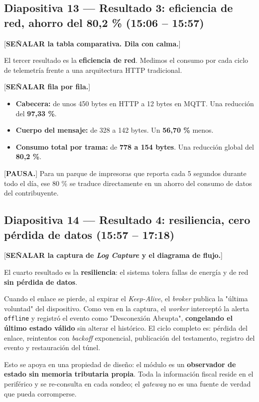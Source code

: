 \documentclass[11pt, a4paper]{article}
\begin{document}
\subsection*{Diapositiva 13 — Resultado 3: eficiencia de red, ahorro del 80,2 \% (15:06 – 15:57)}

[\textbf{SEÑALAR la tabla comparativa. Dila con calma.}]

El tercer resultado es la \textbf{eficiencia de red}. Medimos el consumo por cada ciclo de telemetría frente a una arquitectura HTTP tradicional.

[\textbf{SEÑALAR fila por fila.}]

\begin{itemize}[label=-]
    \item \textbf{Cabecera:} de unos 450 bytes en HTTP a 12 bytes en MQTT. Una reducción del \textbf{97,33 \%}.
    \item \textbf{Cuerpo del mensaje:} de 328 a 142 bytes. Un \textbf{56,70 \%} menos.
    \item \textbf{Consumo total por trama:} de \textbf{778 a 154 bytes}. Una reducción global del \textbf{80,2 \%}.
\end{itemize}

[\textbf{PAUSA.}] Para un parque de impresoras que reporta cada 5 segundos durante todo el día, ese 80 \% se traduce directamente en un ahorro del consumo de datos del contribuyente.

\subsection*{Diapositiva 14 — Resultado 4: resiliencia, cero pérdida de datos (15:57 – 17:18)}

[\textbf{SEÑALAR la captura de \textit{Log Capture} y el diagrama de flujo.}]

El cuarto resultado es la \textbf{resiliencia}: el sistema tolera fallas de energía y de red \textbf{sin pérdida de datos}.

Cuando el enlace se pierde, al expirar el \textit{Keep-Alive}, el \textit{broker} publica la "última voluntad" del dispositivo. Como ven en la captura, el \textit{worker} interceptó la alerta \texttt{offline} y registró el evento como "Desconexión Abrupta", \textbf{congelando el último estado válido} sin alterar el histórico. El ciclo completo es: pérdida del enlace, reintentos con \textit{backoff} exponencial, publicación del testamento, registro del evento y restauración del túnel.

Esto se apoya en una propiedad de diseño: el módulo es un \textbf{observador de estado sin memoria tributaria propia}. Toda la información fiscal reside en el periférico y se re-consulta en cada sondeo; el \textit{gateway} no es una fuente de verdad que pueda corromperse.
\end{document}
